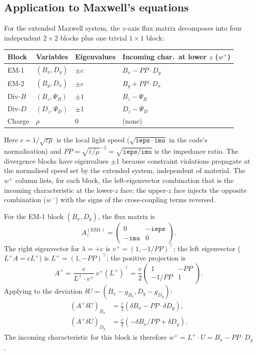 \documentclass[11pt]{article}
\newcommand{\eps}{\varepsilon}
\begin{document}
\subsection{Application to Maxwell's equations}

For the extended Maxwell system, the $z$-axis flux matrix
decomposes into four independent $2\times 2$ blocks plus one
trivial $1\times 1$ block:

\begin{center}
\small
\begin{tabular}{llll}
\toprule
Block        & Variables & Eigenvalues & Incoming char.\ at lower $z$ ($w^+$) \\
\midrule
EM-1         & $(B_x, D_y)$     & $\pm c$ & $B_x - PP \cdot D_y$ \\
EM-2         & $(B_y, D_x)$     & $\pm c$ & $B_y + PP \cdot D_x$ \\
Div-$B$      & $(B_z, \Psi_B)$  & $\pm 1$ & $B_z - \Psi_B$ \\
Div-$D$      & $(D_z, \Psi_D)$  & $\pm 1$ & $D_z - \Psi_D$ \\
Charge       & $\rho$           & $0$     & (none) \\
\bottomrule
\end{tabular}
\end{center}

Here $c = 1/\sqrt{\eps\mu}$ is the local light speed
($\sqrt{\mathtt{ieps}\cdot\mathtt{imu}}$ in the code's
normalisation) and $PP = \sqrt{\eps/\mu}^{-1}
= \sqrt{\mathtt{ieps}/\mathtt{imu}}$ is the impedance ratio.  The
divergence blocks have eigenvalues $\pm 1$ because constraint
violations propagate at the normalised speed set by the extended
system, independent of material.  The $w^+$ column lists, for
each block, the left-eigenvector combination that is the incoming
characteristic at the lower-$z$ face; the upper-$z$ face injects
the opposite combination ($w^-$) with the signs of the
cross-coupling terms reversed.

For the EM-1 block $(B_x, D_y)$, the flux matrix is
\[
  A_z^{(\mathrm{EM1})}
  = \begin{pmatrix} 0 & -\mathtt{ieps} \\
                    -\mathtt{imu} & 0 \end{pmatrix}.
\]
The right eigenvector for $\lambda = +c$ is
$v^+ = (1, -1/PP)^\top$; the left eigenvector
($L^+ A = c L^+$) is $L^+ = (1, -PP)^\top$; the positive
projection is
\[
  A^+ = \frac{c}{L^+ \cdot v^+}\, v^+ (L^+)^\top
      = \frac{c}{2}
        \begin{pmatrix} 1 & -PP \\ -1/PP & 1 \end{pmatrix}.
\]
Applying to the deviation
$\delta U = (B_x - g_{B_x}, D_y - g_{D_y})$:
\begin{align*}
  (A^+ \delta U)_{B_x}
    &= \tfrac{c}{2}(\delta B_x - PP \cdot \delta D_y), \\
  (A^+ \delta U)_{D_y}
    &= \tfrac{c}{2}(-\delta B_x / PP + \delta D_y).
\end{align*}
The incoming characteristic for this block is therefore
$w^+ = L^+ \cdot U = B_x - PP \cdot D_y$.
\end{document}
